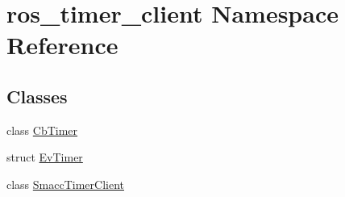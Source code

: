 \hypertarget{namespaceros__timer__client}{}\section{ros\+\_\+timer\+\_\+client Namespace Reference}
\label{namespaceros__timer__client}
\subsection*{Classes}
\begin{DoxyCompactItemize}
\item 
class \hyperlink{classros__timer__client_1_1CbTimer}{Cb\+Timer}
\item 
struct \hyperlink{structros__timer__client_1_1EvTimer}{Ev\+Timer}
\item 
class \hyperlink{classros__timer__client_1_1SmaccTimerClient}{Smacc\+Timer\+Client}
\end{DoxyCompactItemize}
